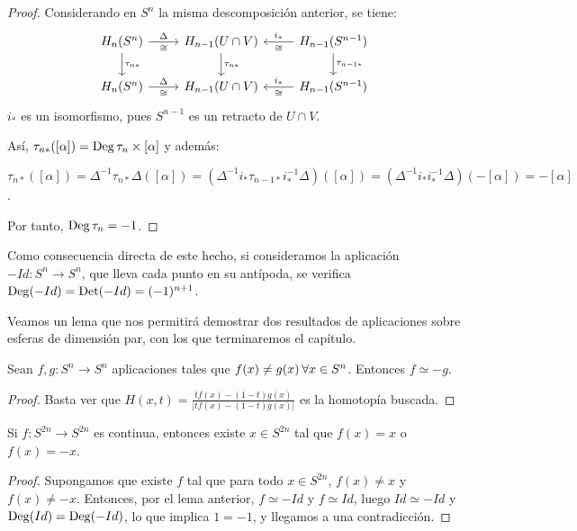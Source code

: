 \begin{proof}
  Considerando en $S^n$ la misma descomposición anterior, se tiene:
  \[ \begin{tikzcd}
    H_n(S^n) \arrow{r}{\Delta}[swap]{\cong} \arrow{d}{\tau_{n*}} & H_{n-1}(U \cap V) \arrow{d}{\tau_{n*}} & \arrow{l}{\cong}[swap]{i_*} H_{n-1}(S^{n-1}) \arrow{d}{\tau_{n-1*}} \\
    H_n(S^n) \arrow{r}{\Delta}[swap]{\cong} & H_{n-1}(U \cap V) & \arrow{l}{\cong}[swap]{i_*} H_{n-1}(S^{n-1})
  \end{tikzcd} \]
  $i_*$ es un isomorfismo, pues $S^{n-1}$ es un retracto de $U \cap V$.

  Así, $\tau_{n*}([\alpha]) = \operatorname{Deg} \tau_n \times [\alpha]$ y además:

  $\tau_{n*}([\alpha]) = \Delta^{-1} \tau_{n*} \Delta([\alpha]) = (\Delta^{-1} i_* \tau_{n-1*} i_*^{-1} \Delta)([\alpha])
  = (\Delta^{-1} i_* i_*^{-1} \Delta)(-[\alpha]) = -[\alpha]$.

  Por tanto, $\operatorname{Deg} \tau_n = -1$.
\end{proof}

Como consecuencia directa de este hecho, si consideramos la aplicación $-Id \colon S^n \to S^n$, que lleva
cada punto en su antípoda, se verifica $\operatorname{Deg} (-Id) = \operatorname{Det} (-Id) = (-1)^{n+1}$.

Veamos un lema que nos permitirá demostrar dos resultados de aplicaciones sobre esferas de dimensión par,
con los que terminaremos el capítulo.

\begin{lemma}
  Sean $f, g \colon S^n \to S^n$ aplicaciones tales que $f(x) \neq g(x) \hspace{0.2em} \forall x \in S^n$.
  Entonces $f \simeq -g$.
\end{lemma}

\begin{proof}
  Basta ver que $H(x, t) = \frac{t f(x) - (1-t)g(x)}{|t f(x) - (1-t)g(x)|}$ es la homotopía buscada.
\end{proof}

\begin{corollary}
  Si $f \colon S^{2n} \to S^{2n}$ es continua, entonces existe $x \in S^{2n}$ tal que $f(x) = x$ o $f(x) = -x$.
\end{corollary}

\begin{proof}
  Supongamos que existe $f$ tal que para todo $x \in S^{2n}$, $f(x) \neq x$ y $f(x) \neq -x$. Entonces, por
  el lema anterior, $f \simeq -Id$ y $f \simeq Id$, luego $Id \simeq -Id$ y $\operatorname{Deg} (Id) = \operatorname{Deg} (-Id)$, lo que implica
  $1 = -1$, y llegamos a una contradicción.
\end{proof}

